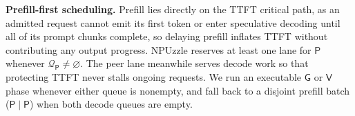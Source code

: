 \documentclass[sigconf,nonacm,10pt]{acmart}
\newcommand{\name}{NPUzzle\xspace}
\begin{document}
\noindent\textbf{Prefill-first scheduling.} \label{sec:schedule_prefill}
Prefill lies directly on the TTFT critical path, as an admitted request cannot emit its first token or enter speculative decoding until all of its prompt chunks complete, so delaying prefill inflates TTFT without contributing any output progress. \name  reserves at least one lane for $\mathsf P$ whenever $\mathcal Q_{\mathsf P}\neq\varnothing$. The peer lane meanwhile serves decode work so that protecting TTFT never stalls ongoing requests. We run an executable $\mathsf G$ or $\mathsf V$ phase whenever either queue is nonempty, and fall back to a disjoint prefill batch ($\mathsf P\mid\mathsf P$) when both decode queues are empty.
\end{document}
